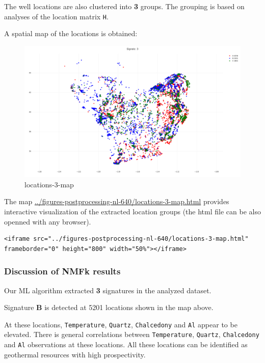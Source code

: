 \documentclass[11pt]{article}
\begin{document}
The well locations are also clustered into \textbf{3} groups. The
grouping is based on analyses of the location matrix \texttt{H}.

A spatial map of the locations is obtained:

\begin{figure}
\centering
\includegraphics{../figures-postprocessing-nl-640/locations-3-map.png}
\caption{locations-3-map}
\end{figure}

The map \url{../figures-postprocessing-nl-640/locations-3-map.html}
provides interactive visualization of the extracted location groups (the
html file can be also openned with any browser).

\begin{verbatim}
<iframe src="../figures-postprocessing-nl-640/locations-3-map.html" frameborder="0" height="800" width="50%"></iframe>
\end{verbatim}

    \hypertarget{discussion-of-nmfk-results}{%
\subsubsection{Discussion of NMFk
results}\label{discussion-of-nmfk-results}}

Our ML algorithm extracted \textbf{3} signatures in the analyzed
dataset.

Signature \textbf{B} is detected at 5201 locations shown in the map
above.

At these locations, \texttt{Temperature}, \texttt{Quartz},
\texttt{Chalcedony} and \texttt{Al} appear to be elevated. There is
general correlations between \texttt{Temperature}, \texttt{Quartz},
\texttt{Chalcedony} and \texttt{Al} observations at these locations. All
these locations can be identified as geothermal resources with high
prospectivity.
\end{document}
